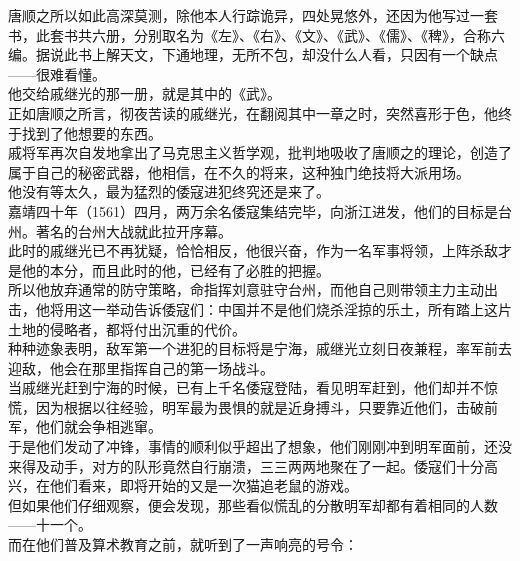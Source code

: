 \begin{multicols}{\theparacolNo}
唐顺之所以如此高深莫测，除他本人行踪诡异，四处晃悠外，还因为他写过一套书，此套书共六册，分别取名为《左》、《右》、《文》、《武》、《儒》、《稗》，合称六编。据说此书上解天文，下通地理，无所不包，却没什么人看，只因有一个缺点——很难看懂。\\

他交给戚继光的那一册，就是其中的《武》。\\

正如唐顺之所言，彻夜苦读的戚继光，在翻阅其中一章之时，突然喜形于色，他终于找到了他想要的东西。\\

戚将军再次自发地拿出了马克思主义哲学观，批判地吸收了唐顺之的理论，创造了属于自己的秘密武器，他相信，在不久的将来，这种独门绝技将大派用场。\\

他没有等太久，最为猛烈的倭寇进犯终究还是来了。\\

嘉靖四十年（1561）四月，两万余名倭寇集结完毕，向浙江进发，他们的目标是台州。著名的台州大战就此拉开序幕。\\

此时的戚继光已不再犹疑，恰恰相反，他很兴奋，作为一名军事将领，上阵杀敌才是他的本分，而且此时的他，已经有了必胜的把握。\\

所以他放弃通常的防守策略，命指挥刘意驻守台州，而他自己则带领主力主动出击，他将用这一举动告诉倭寇们：中国并不是他们烧杀淫掠的乐土，所有踏上这片土地的侵略者，都将付出沉重的代价。\\

种种迹象表明，敌军第一个进犯的目标将是宁海，戚继光立刻日夜兼程，率军前去迎敌，他会在那里指挥自己的第一场战斗。\\

当戚继光赶到宁海的时候，已有上千名倭寇登陆，看见明军赶到，他们却并不惊慌，因为根据以往经验，明军最为畏惧的就是近身搏斗，只要靠近他们，击破前军，他们就会争相逃窜。\\

于是他们发动了冲锋，事情的顺利似乎超出了想象，他们刚刚冲到明军面前，还没来得及动手，对方的队形竟然自行崩溃，三三两两地聚在了一起。倭寇们十分高兴，在他们看来，即将开始的又是一次猫追老鼠的游戏。\\

但如果他们仔细观察，便会发现，那些看似慌乱的分散明军却都有着相同的人数——十一个。\\

而在他们普及算术教育之前，就听到了一声响亮的号令：\\


\end{multicols}
